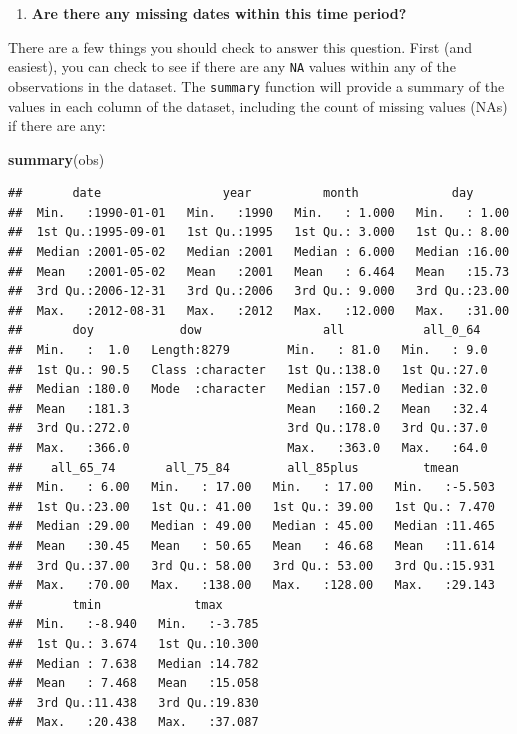 \documentclass[
]{book}
\newenvironment{Shaded}{\begin{snugshade}}{\end{snugshade}}
\newcommand{\KeywordTok}[1]{\textcolor[rgb]{0.13,0.29,0.53}{\textbf{#1}}}
\newcommand{\NormalTok}[1]{#1}
\providecommand{\tightlist}{%
  \setlength{\itemsep}{0pt}\setlength{\parskip}{0pt}}
\begin{document}
\begin{enumerate}
\def\labelenumi{\arabic{enumi}.}
\setcounter{enumi}{1}
\tightlist
\item
  \textbf{Are there any missing dates within this time period?}
\end{enumerate}

There are a few things you should check to answer this question. First
(and easiest), you can check to see if there are any \texttt{NA} values within
any of the observations in the dataset. The \texttt{summary} function will provide
a summary of the values in each column of the dataset, including the count
of missing values (NAs) if there are any:

\begin{Shaded}
\begin{Highlighting}[]
\KeywordTok{summary}\NormalTok{(obs)}
\end{Highlighting}
\end{Shaded}

\begin{verbatim}
##       date                 year          month             day       
##  Min.   :1990-01-01   Min.   :1990   Min.   : 1.000   Min.   : 1.00  
##  1st Qu.:1995-09-01   1st Qu.:1995   1st Qu.: 3.000   1st Qu.: 8.00  
##  Median :2001-05-02   Median :2001   Median : 6.000   Median :16.00  
##  Mean   :2001-05-02   Mean   :2001   Mean   : 6.464   Mean   :15.73  
##  3rd Qu.:2006-12-31   3rd Qu.:2006   3rd Qu.: 9.000   3rd Qu.:23.00  
##  Max.   :2012-08-31   Max.   :2012   Max.   :12.000   Max.   :31.00  
##       doy            dow                 all           all_0_64   
##  Min.   :  1.0   Length:8279        Min.   : 81.0   Min.   : 9.0  
##  1st Qu.: 90.5   Class :character   1st Qu.:138.0   1st Qu.:27.0  
##  Median :180.0   Mode  :character   Median :157.0   Median :32.0  
##  Mean   :181.3                      Mean   :160.2   Mean   :32.4  
##  3rd Qu.:272.0                      3rd Qu.:178.0   3rd Qu.:37.0  
##  Max.   :366.0                      Max.   :363.0   Max.   :64.0  
##    all_65_74       all_75_84        all_85plus         tmean       
##  Min.   : 6.00   Min.   : 17.00   Min.   : 17.00   Min.   :-5.503  
##  1st Qu.:23.00   1st Qu.: 41.00   1st Qu.: 39.00   1st Qu.: 7.470  
##  Median :29.00   Median : 49.00   Median : 45.00   Median :11.465  
##  Mean   :30.45   Mean   : 50.65   Mean   : 46.68   Mean   :11.614  
##  3rd Qu.:37.00   3rd Qu.: 58.00   3rd Qu.: 53.00   3rd Qu.:15.931  
##  Max.   :70.00   Max.   :138.00   Max.   :128.00   Max.   :29.143  
##       tmin             tmax       
##  Min.   :-8.940   Min.   :-3.785  
##  1st Qu.: 3.674   1st Qu.:10.300  
##  Median : 7.638   Median :14.782  
##  Mean   : 7.468   Mean   :15.058  
##  3rd Qu.:11.438   3rd Qu.:19.830  
##  Max.   :20.438   Max.   :37.087
\end{verbatim}
\end{document}
